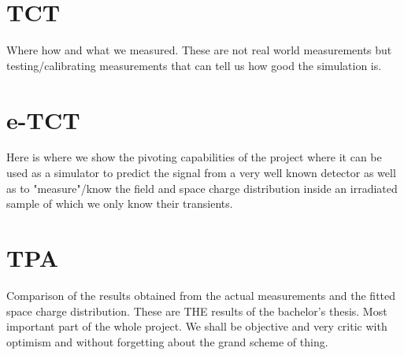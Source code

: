 \section{TCT} %
\label{sec:experimental_method}

Where how and what we measured. These are not real world measurements but testing/calibrating measurements that can tell us how good the simulation is. 


\section{e-TCT} %
\label{sec:fitting_method}

Here is where we show the pivoting capabilities of the project where it can be used as a simulator to predict the signal from a very well known detector as well as to "measure"/know the field and space charge distribution inside an irradiated sample of which we only know their transients.


\section{TPA} %
\label{sec:results_and_comparison_with_tracs_rad}

Comparison of the results obtained from the actual measurements and the fitted space charge distribution. These are THE results of the bachelor's thesis. Most important part of the whole  project. We shall be objective and very critic with optimism and without forgetting about the grand scheme of thing.

